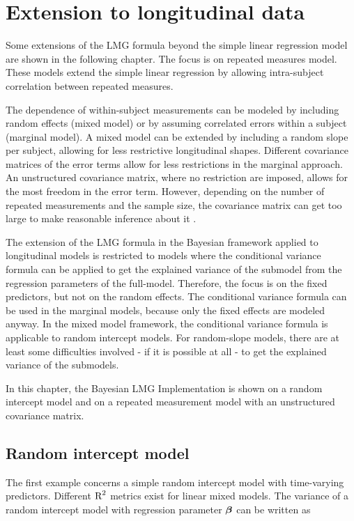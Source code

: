 \documentclass[11pt,a4paper,twoside]{book}
\begin{document}











\chapter{Extension to longitudinal data}

Some extensions of the LMG formula beyond the simple linear regression model are shown in the following chapter. The focus is on repeated measures model. These models extend the simple linear regression by allowing intra-subject correlation between repeated measures.

The dependence of within-subject measurements can be modeled by including random effects (mixed model) or by assuming correlated errors within a subject (marginal model). A mixed model can be extended by including a random slope per subject, allowing for less restrictive longitudinal shapes. Different covariance matrices of the error terms allow for less restrictions in the marginal approach. An unstructured covariance matrix, where no restriction are imposed, allows for the most freedom in the error term. However, depending on the number of repeated measurements and the sample size, the covariance matrix can get too large to make reasonable inference about it \citep{Fitzmaurice2011}. 

The extension of the LMG formula in the Bayesian framework applied to longitudinal models is restricted to models where the conditional variance formula can  be applied to get the explained variance of the submodel from the regression parameters of the full-model. Therefore, the focus is on the fixed predictors, but not on the random effects. The conditional variance formula can be used in the marginal models, because only the fixed effects are modeled anyway. In the mixed model framework, the conditional variance formula is applicable to random intercept models. For random-slope models, there are at least some difficulties involved - if it is possible at all - to get the explained variance of the submodels. 

In this chapter, the Bayesian LMG Implementation is shown on a random intercept model and on a repeated measurement model with an unstructured covariance matrix.  

\section{Random intercept model}
The first example concerns a simple random intercept model with time-varying predictors.  Different $\text{R}^2$ metrics exist for linear mixed models. The variance of a random intercept model with regression parameter ${\boldsymbol{\beta}}$ can be written as
\end{document}

